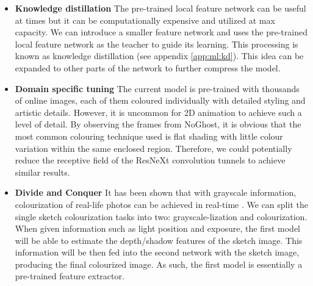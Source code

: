 \begin{itemize}
    \item \textbf{Knowledge distillation} The pre-trained local feature network can be useful at times but it can be computationally expensive and utilized at max capacity. We can introduce a smaller feature network and uses the pre-trained local feature network as the teacher to guide its learning. This processing is known as knowledge distillation (see appendix \ref{app:ml:kd}). This idea can be expanded to other parts of the network to further compress the model.
    \item \textbf{Domain specific tuning} The current model is pre-trained with thousands of online images, each of them coloured individually with detailed styling and artistic details. However, it is uncommon for 2D animation to achieve such a level of detail. By observing the frames from NoGhost, it is obvious that the most common colouring technique used is flat shading with little colour variation within the same enclosed region. Therefore, we could potentially reduce the receptive field of the ResNeXt convolution tunnels to achieve similar results.
    \item \textbf{Divide and Conquer} It has been shown that with grayscale information, colourization of real-life photos can be achieved in real-time \cite{zhangRealTimeUserGuidedImage2017}. We can split the single sketch colourization tasks into two: grayscale-lization and colourization. When given information such as light position and exposure, the first model will be able to estimate the depth/shadow features of the sketch image. This information will be then fed into the second network with the sketch image, producing the final colourized image. As such, the first model is essentially a pre-trained feature extractor.
\end{itemize}

